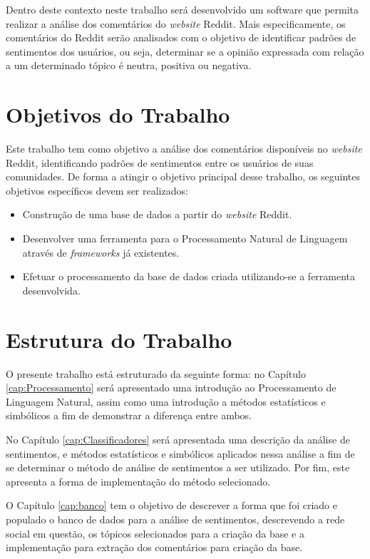 Dentro deste contexto neste trabalho será desenvolvido um software que permita
realizar a análise dos comentários do \textit{website} Reddit. Mais
especificamente, os comentários do Reddit serão analisados com o objetivo de
identificar padrões de sentimentos dos usuários, ou seja, determinar se a
opinião expressada com relação a um determinado tópico é neutra, positiva ou negativa.

\section{Objetivos do Trabalho}

Este trabalho tem como objetivo a análise dos comentários disponíveis no
\textit{website} Reddit, identificando padrões de sentimentos entre os
usuários de suas comunidades. De forma a atingir o objetivo principal desse
trabalho, os seguintes objetivos específicos devem ser realizados:
\begin{itemize}
  
 \item Construção de uma base de dados a partir do \textit{website} Reddit.
 \item Desenvolver uma ferramenta para o Processamento Natural de Linguagem
 através de \textit{frameworks} já existentes.
 \item Efetuar o processamento da base de dados criada utilizando-se a
 ferramenta desenvolvida.
\end{itemize}

\section{Estrutura do Trabalho}

O presente trabalho está estruturado da seguinte forma: no Capítulo
\ref{cap:Processamento} será apresentado uma introdução ao Processamento de
Linguagem Natural, assim como uma introdução a métodos estatísticos e
simbólicos a fim de demonstrar a diferença entre ambos.

No Capítulo \ref{cap:Classificadores} será apresentada uma descrição da análise
de sentimentos, e métodos estatísticos e simbólicos aplicados nessa análise a fim de se determinar o
método de análise de sentimentos a ser utilizado. Por fim, este apresenta
a forma de implementação do método selecionado. 

O Capítulo \ref{cap:banco} tem
o objetivo de descrever a forma que foi criado e populado o banco de dados para a análise de sentimentos, descrevendo a rede social em questão, os tópicos
selecionados para a criação da base e a implementação para extração dos
comentários para criação da base.


